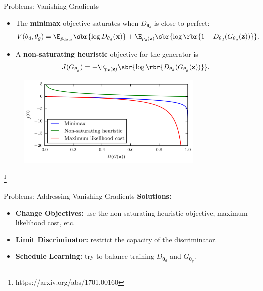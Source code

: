 \documentclass[notheorems]{beamer}
\newcommand{\source}[1]{{\let\thefootnote\relax\footnote{{\tiny #1}}}}
\newcommand{\xx}{\mathbf{x}}
\newcommand{\zz}{\mathbf{z}}
\newcommand{\vtheta}{\mathbf{\theta}}
\begin{document}
    \begin{frame}{Problems: Vanishing Gradients}

        \begin{itemize}
            \item The \textbf{minimax} objective saturates when $D_{\vtheta_d}$ is close to perfect:
            \[ V(\vtheta_d, \vtheta_g) = \E_{p_{\text{data}}} \sbr{\log D_{\vtheta_d}(\xx)} + \E_{p_{\zz}(\zz)} \sbr{\log \rbr{1 - D_{\vtheta_d}(G_{\vtheta_g}(\zz))}}. \]
            \item A \textbf{non-saturating heuristic} objective for the generator is
            \[ J(G_{\vtheta_g}) = - \E_{p_{\zz}(\zz)} \sbr{\log \rbr{D_{\vtheta_d}(G_{\vtheta_g}(\zz))}}. \]
        \end{itemize}

        \begin{figure}
            \centering
            \includegraphics[width=0.8\textwidth]{figures/vanish}
        \end{figure}
        \vspace{-0.5cm}
        \source{https://arxiv.org/abs/1701.00160}

    \end{frame}

    \begin{frame}{Problems: Addressing Vanishing Gradients}
        \textbf{Solutions: }
        \begin{itemize}
            \item \textbf{Change Objectives:} use the non-saturating heuristic objective, maximum-likelihood cost, etc.
            \item \textbf{Limit Discriminator:} restrict the capacity of the discriminator.
            \item \textbf{Schedule Learning:} try to balance training $D_{\vtheta_d}$ and $G_{\vtheta_g}$.
        \end{itemize}

    \end{frame}
\end{document}
